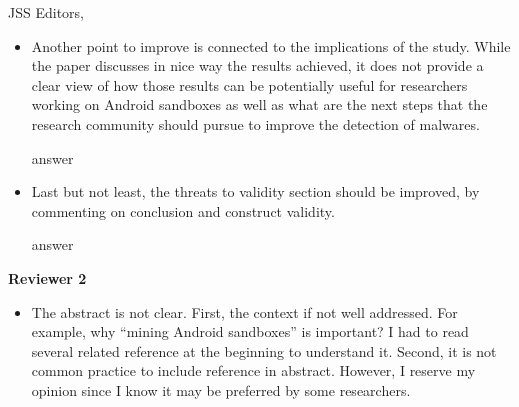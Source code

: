 \documentclass{letter}
\begin{document}
\begin{letter}{JSS Editors,}
\begin{itemize}
\vspace{0.2cm}

{\color{blue}{\bf Answer.} Thanks for this comment. Our tool actually is available at gitHub repository at:

https://github.com/droidxp/benchmark.
 \vspace{0.2cm}

We also provide data and scripts of our experiments on-line at:

https://htmlpreview.github.io/?https://github.com/droidxp/paper-replication-package/blob/master/replication.html. 
\vspace{0.2cm}\newline
At Section 1 (Introduction) we highlight the existence of these 2 repositories that can be useful for other researchers interested in our study.}

\vspace{0.2cm}

\item Another point to improve is connected to the implications of the study. While the paper discusses in nice way the 
results achieved, it does not provide a clear view of how those results can be potentially useful for researchers 
working on Android sandboxes as well as what are the next steps that the research community should pursue to 
improve the detection of malwares.


\vspace{0.2cm}

{\color{blue}{\bf Answer.} answer}

\vspace{0.2cm}

\item Last but not least, the threats to validity section should be improved, by commenting on conclusion and construct validity.


\vspace{0.2cm}

{\color{blue}{\bf Answer.} answer}


\end{itemize}

{\bf Reviewer 2}

\begin{itemize}

\item The abstract is not clear. First, the context if not well addressed. For example, why ``mining Android sandboxes'' is 
important? I had to read several related reference at the beginning to understand it. Second, it is not common practice to 
include reference in abstract. However, I reserve my opinion since I know it may be preferred by some researchers.



\end{itemize}
\end{letter}
\end{document}
